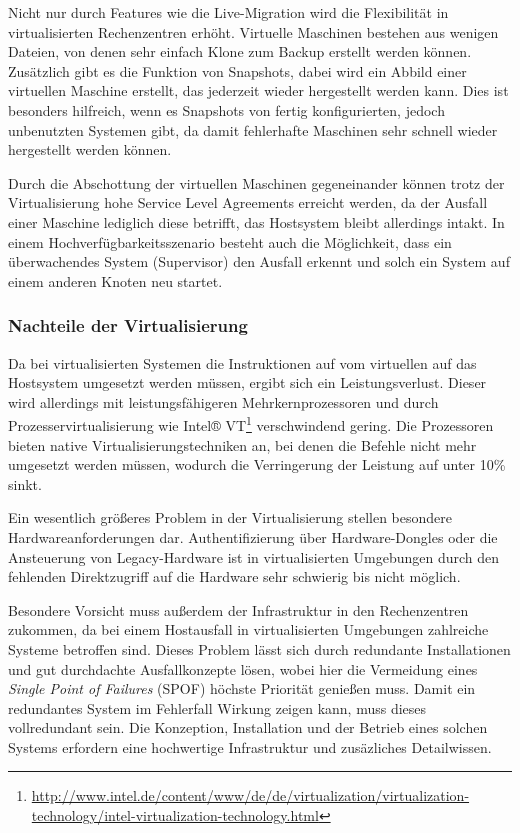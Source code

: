 Nicht nur durch Features wie die Live-Migration wird die Flexibilität in virtualisierten Rechenzentren erhöht.
Virtuelle Maschinen bestehen aus wenigen Dateien, von denen sehr einfach Klone zum Backup erstellt werden können.
Zusätzlich gibt es die Funktion von Snapshots, dabei wird ein Abbild einer virtuellen Maschine erstellt, das jederzeit wieder hergestellt werden kann.
Dies ist besonders hilfreich, wenn es Snapshots von fertig konfigurierten, jedoch unbenutzten Systemen gibt, da damit fehlerhafte Maschinen sehr schnell wieder hergestellt werden können.

Durch die Abschottung der virtuellen Maschinen gegeneinander können trotz der Virtualisierung hohe Service Level Agreements erreicht werden, da der Ausfall einer Maschine lediglich diese betrifft, das Hostsystem bleibt allerdings intakt.
In einem Hochverfügbarkeitsszenario besteht auch die Möglichkeit, dass ein überwachendes System (Supervisor) den Ausfall erkennt und solch ein System auf einem anderen Knoten neu startet.

\subsubsection{Nachteile der Virtualisierung \autocite[198]{Baun2009}}
Da bei virtualisierten Systemen die Instruktionen auf vom virtuellen auf das Hostsystem umgesetzt werden müssen, ergibt sich ein Leistungsverlust.
Dieser wird allerdings mit leistungsfähigeren Mehrkernprozessoren und durch Prozesservirtualisierung wie Intel® VT\footnote{\url{http://www.intel.de/content/www/de/de/virtualization/virtualization-technology/intel-virtualization-technology.html}} verschwindend gering.
Die Prozessoren bieten native Virtualisierungstechniken an, bei denen die Befehle nicht mehr umgesetzt werden müssen, wodurch die Verringerung der Leistung auf unter 10\% \autocite{Hardt2005} sinkt.

Ein wesentlich größeres Problem in der Virtualisierung stellen besondere Hardwareanforderungen dar.
Authentifizierung über Hardware-Dongles oder die Ansteuerung von Legacy-Hardware ist in virtualisierten Umgebungen durch den fehlenden Direktzugriff auf die Hardware sehr schwierig bis nicht möglich.

Besondere Vorsicht muss außerdem der Infrastruktur in den Rechenzentren zukommen, da bei einem Hostausfall in virtualisierten Umgebungen zahlreiche Systeme betroffen sind.
Dieses Problem lässt sich durch redundante Installationen und gut durchdachte Ausfallkonzepte lösen, wobei hier die Vermeidung eines \emph{Single Point of Failures} (SPOF) höchste Priorität genießen muss.
Damit ein redundantes System im Fehlerfall Wirkung zeigen kann, muss dieses vollredundant sein.
Die Konzeption, Installation und der Betrieb eines solchen Systems erfordern eine hochwertige Infrastruktur und zusäzliches Detailwissen.


